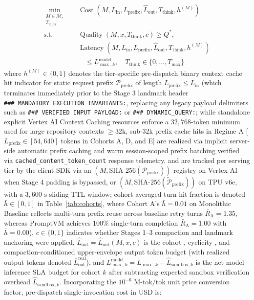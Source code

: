 \documentclass[conference,10pt]{IEEEtran}
\begin{document}
\begin{equation}
\label{eq:pareto_opt}
\begin{aligned}
\min_{\substack{M \in \mathcal{M},\\ T_{\text{think}}}} \quad & \operatorname{Cost}\!\left(M, L_{\text{in}}, L_{\text{prefix}}, \hat{L}_{\text{out}}, T_{\text{think}}, h^{(M)}\right) \\
\text{s.t.} \quad & \operatorname{Quality}(M, x, T_{\text{think}}, c) \ge Q^*, \\
& \operatorname{Latency}\!\left(M, L_{\text{in}}, L_{\text{prefix}}, \hat{L}_{\text{out}}, T_{\text{think}}, h^{(M)}\right) \\
&\quad \le L_{\max,k}^{\text{model}}, \quad T_{\text{think}} \in \{0,\dots,T_{\max}\}
\end{aligned}
\end{equation}
where $h^{(M)} \in \{0, 1\}$ denotes the tier-specific pre-dispatch binary context cache hit indicator for static request prefix $\mathcal{P}_{\text{prefix}}$ of length $L_{\text{prefix}} \le L_{\text{in}}$ (which terminates immediately prior to the Stage 3 landmark header \texttt{\#\#\#\allowbreak\ MANDATORY\allowbreak\ EXECUTION\allowbreak\ INVARIANTS:}, replacing any legacy payload delimiters such as \texttt{\#\#\#\allowbreak\ VERIFIED\allowbreak\ INPUT\allowbreak\ PAYLOAD:} or \texttt{\#\#\#\allowbreak\ DYNAMIC\_\allowbreak QUERY:}; while standalone explicit Vertex AI Context Caching resources enforce a $32{,}768$-token minimum used for large repository contexts $\ge 32\text{k}$, sub-32k prefix cache hits in Regime A [$L_{\text{prefix}} \in [54, 640]\text{ tokens}$ in Cohorts A, D, and E] are realized via implicit server-side automatic prefix caching and warm session-scoped prefix batching verified via \texttt{cached\_content\_token\_count} response telemetry, and are tracked per serving tier by the client SDK via an $(M, \text{SHA-256}(\mathcal{P}_{\text{prefix}}))$ registry on Vertex AI when Stage 4 padding is bypassed, or $(M, \text{SHA-256}(\tilde{\mathcal{P}}_{\text{prefix}}))$ on TPU v6e, with a $3{,}600\text{ s}$ sliding TTL window; cohort-averaged turn hit fraction is denoted $\bar{h} \in [0, 1]$ in Table~\ref{tab:cohorts}, where Cohort A's $\bar{h}=0.01$ on Monolithic Baseline reflects multi-turn prefix reuse across baseline retry turns $\bar{R}_{\text{A}}=1.35$, whereas PromptVM achieves $100\%$ single-turn completion $\bar{R}_{\text{A}}=1.00$ with $\bar{h}=0.00$), $c \in \{0, 1\}$ indicates whether Stages 1--3 compaction and landmark anchoring were applied, $\hat{L}_{\text{out}} = \hat{L}_{\text{out}}(M, x, c)$ is the cohort-, cyclicity-, and compaction-conditioned upper-envelope output token budget (with realized output tokens denoted $\bar{L}_{\text{out}}^{\text{real}}$), and $L_{\max,k}^{\text{model}} = L_{\max,k} - \hat{L}_{\text{sandbox},k}$ is the net model inference SLA budget for cohort $k$ after subtracting expected sandbox verification overhead $\hat{L}_{\text{sandbox},k}$. Incorporating the $10^{-6}\text{ M-tok/tok}$ unit price conversion factor, pre-dispatch single-invocation cost in USD is:
\end{document}
